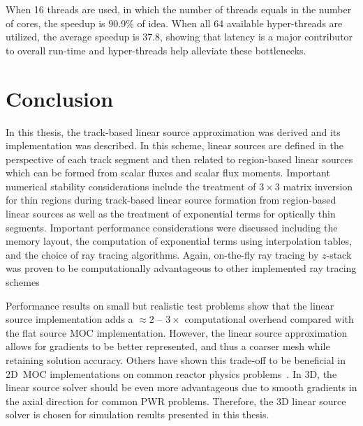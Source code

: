 When 16 threads are used, in which the number of threads equals in the number of cores, the speedup is 90.9\% of idea. When all 64 available hyper-threads are utilized, the average speedup is 37.8, showing that latency is a major contributor to overall run-time and hyper-threads help alleviate these bottlenecks.

\newpage
\section{Conclusion}
\label{sec:ls-conclusion}

In this thesis, the track-based linear source approximation was derived and its implementation was described. In this scheme, linear sources are defined in the perspective of each track segment and then related to region-based linear sources which can be formed from scalar fluxes and scalar flux moments. Important numerical stability considerations include the treatment of $3 \times 3$ matrix inversion for thin regions during track-based linear source formation from region-based linear sources as well as the treatment of exponential terms for optically thin segments. Important performance considerations were discussed including the memory layout, the computation of exponential terms using interpolation tables, and the choice of ray tracing algorithms. Again, on-the-fly ray tracing by $z$-stack was proven to be computationally advantageous to other implemented ray tracing schemes

Performance results on small but realistic test problems show that the linear source implementation adds a  $\approx 2$ -- $3\times$ computational overhead compared with the flat source \ac{MOC} implementation. However, the linear source approximation allows for gradients to be better represented, and thus a coarser mesh while retaining solution accuracy. Others have shown this trade-off to be beneficial in 2D~\ac{MOC} implementations on common reactor physics problems~\cite{ferrer2015linear}. In 3D, the linear source solver should be even more advantageous due to smooth gradients in the axial direction for common \ac{PWR} problems. Therefore, the 3D linear source solver is chosen for simulation results presented in this thesis.

